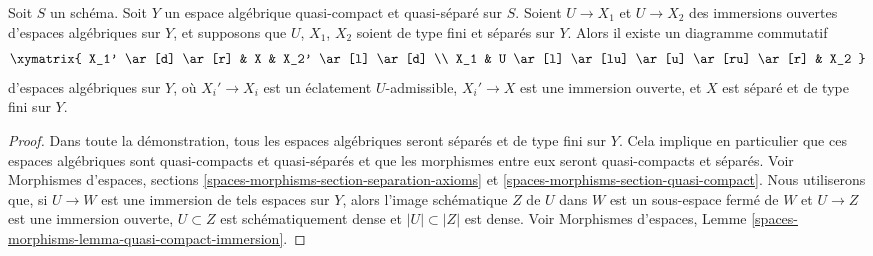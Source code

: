 \begin{lemma}
\label{lemma-find-common-blowups}
Soit $S$ un schéma. Soit $Y$ un espace algébrique quasi-compact et quasi-séparé
sur $S$. Soient $U \to X_1$ et $U \to X_2$ des immersions ouvertes
d'espaces algébriques sur $Y$, et supposons que $U$, $X_1$, $X_2$ soient de type
fini et séparés sur $Y$. Alors il existe un diagramme commutatif
$$
\xymatrix{
X_1' \ar[d] \ar[r] & X & X_2' \ar[l] \ar[d] \\
X_1 & U \ar[l] \ar[lu] \ar[u] \ar[ru] \ar[r] & X_2
}
$$
d'espaces algébriques sur $Y$, où $X_i' \to X_i$ est un éclatement
$U$-admissible, $X_i' \to X$ est une immersion ouverte, et $X$ est séparé et de
type fini sur $Y$.
\end{lemma}

\begin{proof}
Dans toute la démonstration, tous les espaces algébriques seront séparés et de
type fini sur $Y$. Cela implique en particulier que ces espaces algébriques sont
quasi-compacts et quasi-séparés et que les morphismes entre eux
seront quasi-compacts et séparés. Voir
Morphismes d'espaces, sections
\ref{spaces-morphisms-section-separation-axioms} et
\ref{spaces-morphisms-section-quasi-compact}.
Nous utiliserons que, si $U \to W$ est une immersion de tels espaces sur $Y$,
alors l'image schématique $Z$ de $U$ dans $W$ est un sous-espace fermé
de $W$ et $U \to Z$ est une immersion ouverte, $U \subset Z$ est
schématiquement dense et $|U| \subset |Z|$ est dense. Voir
Morphismes d'espaces, Lemme
\ref{spaces-morphisms-lemma-quasi-compact-immersion}.


\end{proof}
